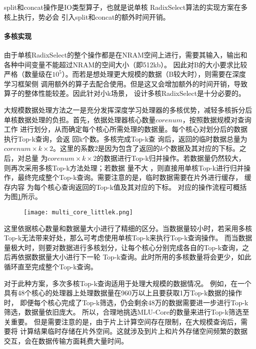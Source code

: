 split和concat操作是IO类型算子，也就是说单核 RadixSelect算法的实现方案在多核上执行，势必会
引入split和concat的额外时间开销。


\paragraph{多核实现}
由于单核RadixSelect的整个操作都是在NRAM空间上进行，需要其输入，输出和各种中间变量不能超过NRAM的空间大小（即512kb）。
因此对B的大小要求比较严格（数量级在$10^5$）。而若是想处理更大规模的数据（B较大时），则需要在深度学习框架侧
调用额外的算子去配合使用。但是这又会增加额外的时间开销，导致算子的整体性能较差。因此针对小k场景，
设计多核RadixSelect是十分必要的。

大规模数据处理方法之一是充分发挥深度学习处理器的多核优势，减轻多核拆分后单核数据处理的负担。首先，依据处理器核心数量\(corenum\)，按照数据规模对查询工作
进行划分，从而确定每个核心所需处理的数据量。每个核心对划分后的数据执行Top-k查询，会返
回k个数。多核完成Top-k查
询后，返回的临时数据总量为\(corenum×k×2\)。这里的系数\(2\)是因为包含了返回的\(k\)个数据及其对应的下标。之后，对总量
为\(corenum×k×2\)的数据进行Top-k归并操作。若数据量仍然较大，则再次采用多核Top-k方法处理；若数据
量不大
，则直接用单核Top-k进行归并操作，最终完成整个Top-k查询。需要注意的是，临时数据需要在片外进行缓存，
缓存内容
为每个核心查询返回的Top-k值及其对应的下标。
对应的操作流程可概括为图\ref{fig:multi_core_littlek}所示。
\begin{figure}[ht]
    \centering
    \texttt{[image: multi\_core\_littlek.png]}
    \caption{}
    \label{fig:multi_core_littlek}
\end{figure}
    
这里依据核心数量和数据量大小进行了精细的区分。当数据量较小时，若采用多核Top-k无法带来好处，那么可考虑使用单核Top-k来执行Top-k查询操作。
而当数据量极大时，则要对数据进行多核划分，让每个核心分别完成各自的Top-k查询，之后再依据数据量大小进行下一轮
Top-k查询。此时所用的多核数量将会更少，如此循环直至完成整个Top-k查询。

对于此种方案，多次多核Top-k查询适用于处理大规模的数据情况。
例如，在一个具有48个核心的处理器上处理数据量在960万以上且要获取1万Top-k数据的操作时，
即便每个核心完成了Top-k筛选，仍会剩余48万的数据需要进一步进行Top-k筛选，数据量依旧庞大。
所以，合理地挑选MLU-Core的数量来进行Top-k筛选至关重要。
但是需要注意的是，由于片上计算空间存在限制，在大规模查询后，需要将
计算结果临时存储在片外空间。这就涉及到片上和片外存储空间频繁的数据交互，会在数据传输方面耗费大量时间。

